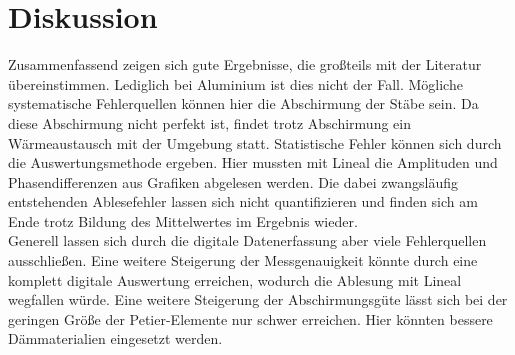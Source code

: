 \section{Diskussion}
Zusammenfassend zeigen sich gute Ergebnisse, die großteils mit der Literatur übereinstimmen. Lediglich bei Aluminium ist dies nicht der Fall.
Mögliche systematische Fehlerquellen können hier die Abschirmung der Stäbe sein. Da diese Abschirmung nicht perfekt ist, findet trotz
Abschirmung ein Wärmeaustausch mit der Umgebung statt. Statistische Fehler können sich durch die Auswertungsmethode ergeben. Hier mussten
mit Lineal die Amplituden und Phasendifferenzen aus Grafiken abgelesen werden. Die dabei zwangsläufig entstehenden Ablesefehler lassen sich
nicht quantifizieren und finden sich am Ende trotz Bildung des Mittelwertes im Ergebnis wieder.
\\
Generell lassen sich durch die digitale Datenerfassung aber viele Fehlerquellen ausschließen. Eine weitere Steigerung der Messgenauigkeit könnte
durch eine komplett digitale Auswertung erreichen, wodurch die Ablesung mit Lineal wegfallen würde. Eine weitere Steigerung der Abschirmungsgüte
lässt sich bei der geringen Größe der Petier-Elemente nur schwer erreichen. Hier könnten bessere Dämmaterialien eingesetzt werden.

\newpage
\nocite{*}
\printbibliography
